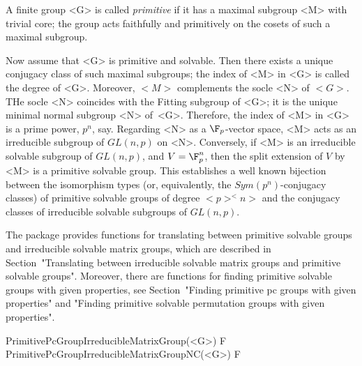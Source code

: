 


A finite group <G> is called {\it primitive} if it has a maximal subgroup <M> with 
trivial core; the group acts faithfully and primitively on the cosets of such
a maximal subgroup.  

Now assume that <G> is primitive and solvable. Then there exists a unique conjugacy class of 
such maximal subgroups; the index of <M> in <G> is called the degree of <G>.
Moreover, $<M>$ 
complements the socle <N> of $<G>$. THe socle <N> coincides with the Fitting subgroup of <G>; it is the unique minimal normal subgroup <N> of~<G>. Therefore, the index of <M> in <G> is a prime power, $p^n$, say.
Regarding <N> as a $\F_p$-vector space, <M> acts as an irreducible subgroup of $GL(n,p)$ on <N>.
Conversely, if <M> is an irreducible solvable subgroup of $GL(n,p)$, and $V = \F_p^n$, then the
split extension of $V$ by <M> is a primitive solvable group. 
This establishes a well known
bijection between the isomorphism types (or, equivalently, the $Sym(p^n)$-conjugacy classes) of primitive solvable groups of degree
$<p>^<n>$ and the conjugacy classes of irreducible solvable subgroups of $GL(n, p)$.

The {\IRREDSOL} package provides functions for translating between primitive solvable groups and irreducible solvable matrix groups, which are
described in Section~"Translating between irreducible solvable matrix groups 
and primitive solvable groups". Moreover, there are functions for finding
primitive solvable groups with given properties, see Section~"Finding primitive pc groups
with given properties" and "Finding primitive solvable permutation groups
with given properties".




\>PrimitivePcGroupIrreducibleMatrixGroup(<G>) F
\>PrimitivePcGroupIrreducibleMatrixGroupNC(<G>) F


